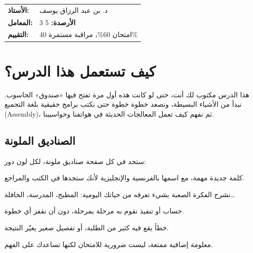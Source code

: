 \documentclass[11pt, a4paper, oneside]{report}
\begin{document}
\begin{titlepage}
\vfill
\begin{flushright}
    \begin{tabular}{@{}ll}
        \textbf{الأستاذ:} & د. بن عبد الرزاق يوسف \\
        \textbf{المعامل:} & \textenglish{3} \quad\textbf{الأرصدة:} \textenglish{5} \\
        \textbf{التقييم:} & امتحان \textenglish{60\%}، مراقبة مستمرة \textenglish{40\%} \\
    \end{tabular}
\end{flushright}
\end{titlepage}

\chapter*{كيف تستعمل هذا الدرس؟}

هذا الدرس مكتوب لك أنت، حتى لو كانت هذه أول مرة تفتح فيها «صندوق» الحاسوب.
نبدأ من الأشياء البسيطة، ونصعد خطوة خطوة حتى نكتب برامج حقيقية بلغة التجميع
\textenglish{(Assembly)}، ثم نفهم كيف تعمل المعالجات الحديثة في هواتفنا وحواسيبنا.

\section*{الصناديق الملونة}
ستجد في كل صفحة صناديق ملونة، لكل لون دور:

\begin{tarif}
    كلمة جديدة مهمة، مع اسمها بالفرنسية والإنجليزية لأنك ستجدها في الكتب والمراجع.
\end{tarif}
\begin{tashbih}
    نشرح الفكرة الصعبة بشيء تعرفه من حياتك اليومية: المطبخ، المدرسة، الحافلة\dots
\end{tashbih}
\begin{khatwa}
    حساب أو تنفيذ نقوم به مرحلة بمرحلة، دون أن نقفز أي خطوة.
\end{khatwa}
\begin{intabih}
    خطأ يقع فيه كثير من الطلبة، أو تفصيل صغير يغيّر النتيجة.
\end{intabih}
\begin{hal}
    معلومة إضافية ممتعة، ليست ضرورية للامتحان لكنها تساعدك على الفهم.
\end{hal}
\end{document}
